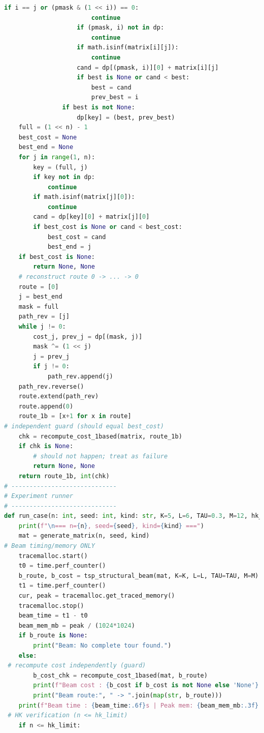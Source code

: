 \documentclass[sn-mathphys]{article}
\theoremstyle{thmstyleone}%
\theoremstyle{thmstyletwo}%
\theoremstyle{thmstylethree}%
\begin{document}
\begin{appendices}
\begin{lstlisting}[language=Python]
                    if i == j or (pmask & (1 << i)) == 0:
                        continue
                    if (pmask, i) not in dp:
                        continue
                    if math.isinf(matrix[i][j]):
                        continue
                    cand = dp[(pmask, i)][0] + matrix[i][j]
                    if best is None or cand < best:
                        best = cand
                        prev_best = i
                if best is not None:
                    dp[key] = (best, prev_best)
    full = (1 << n) - 1
    best_cost = None
    best_end = None
    for j in range(1, n):
        key = (full, j)
        if key not in dp:
            continue
        if math.isinf(matrix[j][0]):
            continue
        cand = dp[key][0] + matrix[j][0]
        if best_cost is None or cand < best_cost:
            best_cost = cand
            best_end = j
    if best_cost is None:
        return None, None
    # reconstruct route 0 -> ... -> 0
    route = [0]
    j = best_end
    mask = full
    path_rev = [j]
    while j != 0:
        cost_j, prev_j = dp[(mask, j)]
        mask ^= (1 << j)
        j = prev_j
        if j != 0:
            path_rev.append(j)
    path_rev.reverse()
    route.extend(path_rev)
    route.append(0)
    route_1b = [x+1 for x in route]
# independent guard (should equal best_cost)
    chk = recompute_cost_1based(matrix, route_1b)
    if chk is None:
        # should not happen; treat as failure
        return None, None
    return route_1b, int(chk)
# -----------------------------
# Experiment runner
# -----------------------------
def run_case(n: int, seed: int, kind: str, K=5, L=6, TAU=0.3, M=12, hk_limit: int = 12):
    print(f"\n=== n={n}, seed={seed}, kind={kind} ===")
    mat = generate_matrix(n, seed, kind)
# Beam timing/memory ONLY
    tracemalloc.start()
    t0 = time.perf_counter()
    b_route, b_cost = tsp_structural_beam(mat, K=K, L=L, TAU=TAU, M=M)
    t1 = time.perf_counter()
    cur, peak = tracemalloc.get_traced_memory()
    tracemalloc.stop()
    beam_time = t1 - t0
    beam_mem_mb = peak / (1024*1024)
    if b_route is None:
        print("Beam: No complete tour found.")
    else:
 # recompute cost independently (guard)
        b_cost_chk = recompute_cost_1based(mat, b_route)
        print(f"Beam cost : {b_cost if b_cost is not None else 'None'}  | recomputed: {int(b_cost_chk) if b_cost_chk is not None else 'None'}")
        print("Beam route:", " -> ".join(map(str, b_route)))
    print(f"Beam time : {beam_time:.6f}s | Peak mem: {beam_mem_mb:.3f} MB")
 # HK verification (n <= hk_limit)
    if n <= hk_limit:

\end{lstlisting}
\end{appendices}
\end{document}
